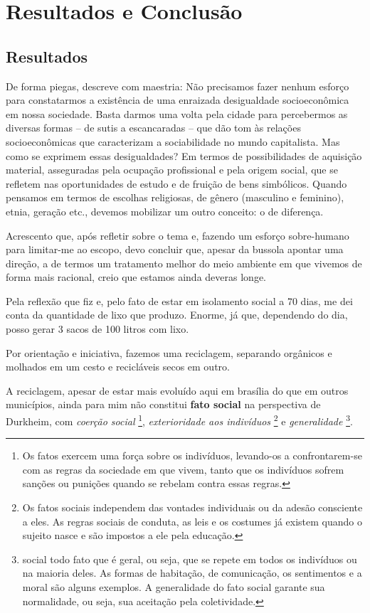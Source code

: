 \chapter{Resultados e Conclusão}

\section{Resultados}

De forma piegas,  descreve com maestria: Não precisamos fazer nenhum esforço para constatarmos a existência de uma enraizada desigualdade socioeconômica em nossa sociedade. Basta darmos
uma volta pela cidade para percebermos as diversas formas – de sutis a escancaradas
– que dão tom às relações socioeconômicas que caracterizam a sociabilidade
no mundo capitalista. Mas como se exprimem essas desigualdades?
Em termos de possibilidades de aquisição material, asseguradas pela ocupação
profissional e pela origem social, que se refletem nas oportunidades de
estudo e de fruição de bens simbólicos. Quando pensamos em termos de escolhas
religiosas, de gênero (masculino e feminino), etnia, geração etc., devemos
mobilizar um outro conceito: o de diferença.

Acrescento que, após refletir sobre o tema e, fazendo um esforço sobre-humano para limitar-me ao escopo,
devo concluir que, apesar da bussola apontar uma direção, a de termos um tratamento melhor do
meio ambiente em que vivemos de forma mais racional, creio que estamos ainda deveras longe.

Pela reflexão que fiz e, pelo fato de estar em isolamento social a 70 dias, me dei conta da quantidade de lixo que produzo.
Enorme, já que, dependendo do dia, posso gerar 3 sacos de 100 litros com lixo.

Por orientação e iniciativa, fazemos uma reciclagem, separando orgânicos e molhados em um cesto e recicláveis secos em outro.

A reciclagem, apesar de estar mais evoluído aqui em brasília do que em outros municípios, ainda para mim não constitui \textbf{fato social} na perspectiva de Durkheim, com
\textit{coerção social} \footnote{Os fatos exercem uma força sobre os indivíduos, levando-os a
confrontarem-se com as regras da sociedade em que vivem, tanto que os indivíduos sofrem sanções ou punições quando se rebelam contra essas regras.},
\textit{exterioridade aos indivíduos} \footnote{Os fatos sociais independem das vontades individuais ou da adesão consciente a eles. As regras sociais de conduta, as leis e os costumes já existem quando o sujeito nasce e são impostos a ele pela educação.} e
\textit{generalidade} \footnote{social todo fato que é geral, ou seja, que se repete em todos os indivíduos ou na maioria deles. As formas de habitação, de comunicação, os sentimentos e a moral são alguns exemplos. A generalidade do fato social garante sua normalidade, ou seja, sua aceitação pela coletividade.}.

